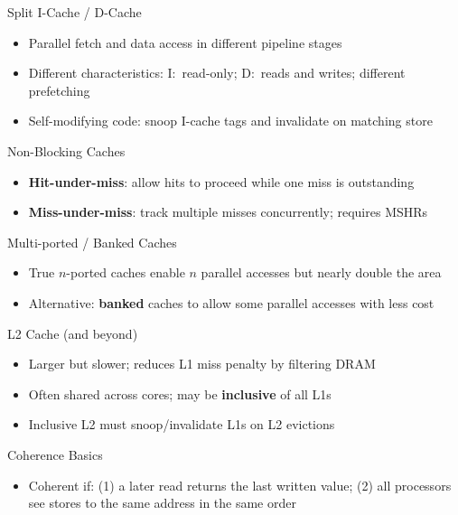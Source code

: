 \documentclass[aspectratio=169,12pt]{beamer}
\begin{document}
\begin{frame}{Split I-Cache / D-Cache}
\begin{itemize}
  \item Parallel fetch and data access in different pipeline stages
  \item Different characteristics: I$:$ read-only; D$:$ reads and writes; different prefetching
  \item Self-modifying code: snoop I-cache tags and invalidate on matching store
\end{itemize}
\end{frame}

\begin{frame}{Non-Blocking Caches}
\begin{itemize}
  \item \textbf{Hit-under-miss}: allow hits to proceed while one miss is outstanding
  \item \textbf{Miss-under-miss}: track multiple misses concurrently; requires MSHRs
\end{itemize}
\end{frame}

\begin{frame}{Multi-ported / Banked Caches}
\begin{itemize}
  \item True $n$-ported caches enable $n$ parallel accesses but nearly double the area
  \item Alternative: \textbf{banked} caches to allow some parallel accesses with less cost
\end{itemize}
\end{frame}

\begin{frame}{L2 Cache (and beyond)}
\begin{itemize}
  \item Larger but slower; reduces L1 miss penalty by filtering DRAM
  \item Often shared across cores; may be \textbf{inclusive} of all L1s
  \item Inclusive L2 must snoop/invalidate L1s on L2 evictions
\end{itemize}
\end{frame}

\begin{frame}{Coherence Basics}
\begin{itemize}
  \item Coherent if: (1) a later read returns the last written value; (2) all processors see stores to the same address in the same order
\end{itemize}
\end{frame}
\end{document}

